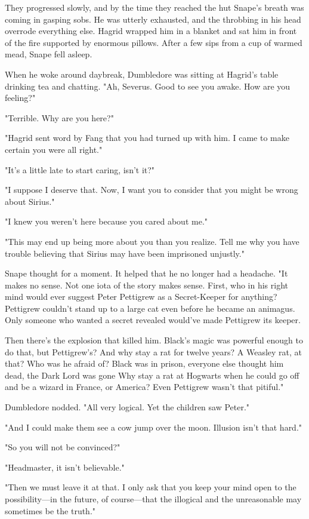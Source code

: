They progressed slowly, and by the time they reached the hut Snape's breath was coming in gasping sobs. He was utterly exhausted, and the throbbing in his head overrode everything else. Hagrid wrapped him in a blanket and sat him in front of the fire supported by enormous pillows. After a few sips from a cup of warmed mead, Snape fell asleep.

When he woke around daybreak, Dumbledore was sitting at Hagrid's table drinking tea and chatting. "Ah, Severus. Good to see you awake. How are you feeling?"

"Terrible. Why are you here?"

"Hagrid sent word by Fang that you had turned up with him. I came to make certain you were all right."

"It's a little late to start caring, isn't it?"

"I suppose I deserve that. Now, I want you to consider that you might be wrong about Sirius."

"I knew you weren't here because you cared about me."

"This may end up being more about you than you realize. Tell me why you have trouble believing that Sirius may have been imprisoned unjustly."

Snape thought for a moment. It helped that he no longer had a headache. "It makes no sense. Not one iota of the story makes sense. First, who in his right mind would ever suggest Peter Pettigrew as a Secret-Keeper for anything? Pettigrew couldn't stand up to a large cat even before he became an animagus. Only someone who wanted a secret revealed would've made Pettigrew its keeper.

\textooquote Then there's the explosion that killed him. Black's magic was powerful enough to do that, but Pettigrew's? And why stay a rat for twelve years? A Weasley rat, at that? Who was he afraid of? Black was in prison, everyone else thought him dead, the Dark Lord was gone{\el} Why stay a rat at Hogwarts when he could go off and be a wizard in France, or America? Even Pettigrew wasn't that pitiful."

Dumbledore nodded. "All very logical. Yet the children saw Peter."

"And I could make them see a cow jump over the moon. Illusion isn't that hard."

"So you will not be convinced?"

"Headmaster, it isn't believable."

"Then we must leave it at that. I only ask that you keep your mind open to the possibility—in the future, of course—that the illogical and the unreasonable may sometimes be the truth."

